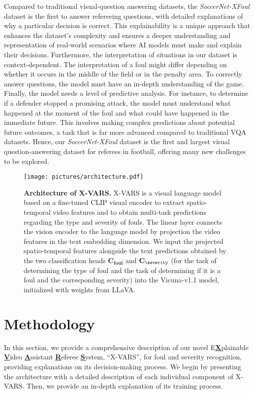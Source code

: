 Compared to traditional visual-question answering datasets, the \textit{SoccerNet-XFoul} dataset is the first to answer refereeing questions, with detailed explanations of why a particular decision is correct. 
This explainability is a unique approach that enhances the dataset’s complexity and ensures a deeper understanding and representation of real-world scenarios where AI models must make and explain their decisions.
Furthermore, the interpretation of situations in our dataset is context-dependent. 
The interpretation of a foul might differ depending on whether it occurs in the middle of the field or in the penalty area. To correctly answer questions, the model must have an in-depth understanding of the game.
Finally, the model needs a level of predictive analysis. For instance, to determine if a defender stopped a promising attack, the model must understand what happened at the moment of the foul and what could have happened in the immediate future. This involves making complex predictions about potential future outcomes, a task that is far more advanced compared to traditional VQA datasets.
Hence, our \textit{SoccerNet-XFoul} dataset is the first and largest visual question-answering dataset for referees in football, offering many new challenges to be explored.

\begin{figure*}[t]
  \centering
  \texttt{[image: pictures/architecture.pdf]}
\caption{
\textbf{Architecture of X-VARS.}  
X-VARS is a visual language model based on a fine-tuned CLIP visual encoder to extract spatio-temporal video features and to obtain multi-task predictions regarding the type and severity of fouls. The linear layer connects the vision encoder to the language model by projection the video features in the text embedding dimension. We input the projected spatio-temporal features alongside the text predictions obtained by the two classification heads $\mathbf{C_{foul}}$ and $\mathbf{C_{\severity}}$ (for the task of determining the type of foul and the task of determining if it is a foul and the corresponding severity) into the Vicuna-v1.1 model, initialized with weights from LLaVA.
}
\label{fig:architecture}
\end{figure*}
\section{Methodology}
\label{sec:method}
In this section, we provide a comprehensive description of our novel E\textbf{\underline{X}}plainable \textbf{\underline{V}}ideo \textbf{\underline{A}}ssistant \textbf{\underline{R}}eferee \textbf{\underline{S}}ystem, ``X-VARS'', for foul and severity recognition, providing explanations on its decision-making process. We begin by presenting the architecture with a detailed description of each individual component of X-VARS. Then, we provide an in-depth explanation of its training process.

